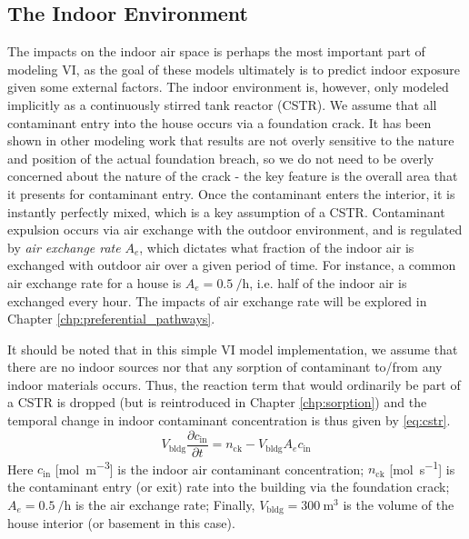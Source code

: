 \subsection{The Indoor Environment}\label{sec:indoor}

The impacts on the indoor air space is perhaps the most important part of modeling VI, as the goal of these models ultimately is to predict indoor exposure given some external factors.
The indoor environment is, however, only modeled implicitly as a continuously stirred tank reactor (CSTR).
We assume that all contaminant entry into the house occurs via a foundation crack.
It has been shown in other modeling work that results are not overly sensitive to the nature and position of the actual foundation breach\cite{yao_simulating_2013}, so we do not need to be overly concerned about the nature of the crack - the key feature is the overall area that it presents for contaminant entry.
Once the contaminant enters the interior, it is instantly perfectly mixed, which is a key assumption of a CSTR.
Contaminant expulsion occurs via air exchange with the outdoor environment, and is regulated by \textit{air exchange rate} $A_e$, which dictates what fraction of the indoor air is exchanged with outdoor air over a given period of time.
For instance, a common air exchange rate for a house is $A_e = \SI{0.5}{\per\hour}$, i.e. half of the indoor air is exchanged every hour.
The impacts of air exchange rate will be explored in Chapter \ref{chp:preferential_pathways}.\par

It should be noted that in this simple VI model implementation, we assume that there are no indoor sources nor that any sorption of contaminant to/from any indoor materials occurs.
Thus, the reaction term that would ordinarily be part of a CSTR is dropped (but is reintroduced in Chapter \ref{chp:sorption}) and the temporal change in indoor contaminant concentration is thus given by \eqref{eq:cstr}.
\begin{equation}\label{eq:cstr}
  V_\mathrm{bldg}\frac{\partial c_\mathrm{in}}{\partial t} = n_\mathrm{ck} - V_\mathrm{bldg} A_e c_\mathrm{in}
\end{equation}
Here $c_\mathrm{in}$ [\si{\mol\per\metre\cubed}] is the indoor air contaminant concentration;
$n_\mathrm{ck}$ [\si{\mol\per\second}] is the contaminant entry (or exit) rate into the building via the foundation crack;
$A_e = \SI{0.5}{\per\hour}$ is the air exchange rate;
Finally, $V_\mathrm{bldg} = \SI{300}{\metre\cubed}$ is the volume of the house interior (or basement in this case).\par

